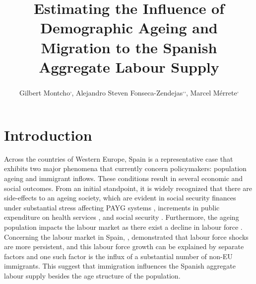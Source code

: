 \documentclass{article}
\title{\textbf{Estimating the Influence of Demographic Ageing and Migration to the Spanish Aggregate Labour Supply}}
\author{
  Gilbert Montcho\textsuperscript{\affiliationA,\equalcontributor},
  Alejandro Steven Fonseca-Zendejas\textsuperscript{\affiliationB,\equalcontributor,\correspondingA},
  Marcel Mérrete\textsuperscript{\affiliationC,\equalcontributor}
}
\makeatletter
\newcommand{\myfnsymbol}[1]{%
  \expandafter\@myfnsymbol\csname c@#1\endcsname
}
\newcommand{\@myfnsymbol}[1]{%
  \ifcase #1
  \or 1%
  \or 2%
  \or 3%
  \or \TextOrMath{\textasteriskcentered}{*}%
  \or \TextOrMath{\textdagger}{\dagger}%
  \fi
}
\makeatother
\begin{document}
\renewcommand{\thefootnote}{\myfnsymbol{footnote}}
\maketitle
%
%
%
%
%

\setcounter{footnote}{0}%
\renewcommand{\thefootnote}{\fnsymbol{footnote}}

\begin{abstract}
    
\end{abstract}

\section*{Introduction}

Across the countries of Western Europe, Spain is a representative case that exhibits two major phenomena that currently concern policymakers: population ageing and immigrant inflows. These conditions result in several economic and social outcomes. From an initial standpoint, it is widely recognized that there are side-effects to an ageing society, which are evident in social security finances under substantial stress affecting PAYG systems \cite{ diaz2009delaying,boeri2024pay}, increments in public expenditure on health services \cite{cristea2020impact, aiyar2016impact, bijak2007population}, and social security \cite{failde2021perspective}. Furthermore, the ageing population impacts the labour market as there exist a decline in labour force \cite{maestas2023effect}. Concerning the labour market in Spain, \cite{casares2018labor}, demonstrated that labour force shocks are more persistent, and this labour force growth can be explained by separate factors and one such factor is the influx of a substantial number of non-EU immigrants. This suggest that immigration influences the Spanish aggregate labour supply besides the age structure of the population. \\
\end{document}
